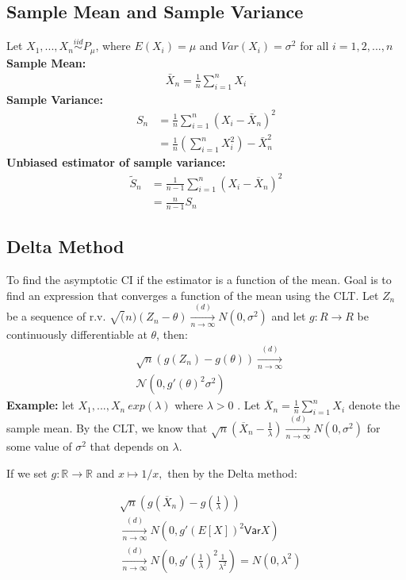 \subsection{Sample Mean and Sample Variance}
Let $X_1, ..., X_n \stackrel{iid}{\sim} P_{\mu}$, where $E(X_i)=\mu$ and $Var(X_i)=\sigma^2$ for all $i=1,2,...,n$\\
\textbf{Sample Mean:}
\begin{align*}
\bar{X}_n= \frac{1}{n} \sum_{i=1}^{n} X_i
\end{align*}
\textbf{Sample Variance:}
\begin{align*}
S_n &= \frac{1}{n} \sum_{i=1}^{n} (X_i - \bar{X}_n)^2\\ 
&= \frac{1}{n} (\sum_{i=1}^{n} X_i^2) - \bar{X}_n^2
\end{align*}
\textbf{Unbiased estimator of sample variance:}
\begin{align*}
\tilde{S}_n &= \displaystyle  \frac{1}{n-1} \sum _{i=1}^ n \left(X_ i - \overline{X}_ n\right)^2\\
&= \frac{n}{n-1} S_n
\end{align*}
\subsection{Delta Method}

To find the asymptotic CI if the estimator is a function of the mean. Goal is to find an expression that converges a function of the mean using the CLT. Let $Z_n$ be a sequence of r.v. $\sqrt(n) (Z_n-\theta) \xrightarrow[n \rightarrow \infty]{(d)} N(0,\sigma^2)$ and let $g: R\longrightarrow R$ be continuously differentiable at $\theta$, then:
\begin{align*}
&\sqrt{n}(g(Z_n) - g(\theta)) \xrightarrow [n \to \infty ]{(d)}\\
&\mathcal{N}(0, g'(\theta )^2 \sigma ^2)
\end{align*}
\textbf{Example:} let  $X_1,... ,X_n ~ exp(\lambda)$  where  $\lambda>0$ . Let  $\overline{X}_ n= \frac{1}{n} \sum _{i = 1}^ n X_ i$ denote the sample mean. By the CLT, we know that $\sqrt{n}\left(\overline{X}_ n - \frac{1}{\lambda }\right) \xrightarrow [n \to \infty ]{(d)} N(0, \sigma ^2)$ for some value of  $\sigma^2$  that depends on  $\lambda$.

If we set $g: \displaystyle \mathbb {R} \to \mathbb {R}$ and $\displaystyle x \mapsto 1/x,$ then by the Delta method:

\begin{align*}
&\sqrt{n}\left( g(\overline{X}_ n) - g\left(\frac{1}{\lambda }\right) \right)\\
&\xrightarrow [n \to \infty ]{(d)} N(0, g'(E[X])^2\textsf{Var}{X})\\
&\xrightarrow [n \to \infty ]{(d)} N(0, g'\left(\frac{1}{\lambda }\right)^2\frac{1}{\lambda ^2}) =  N(0, \lambda^2)
\end{align*}